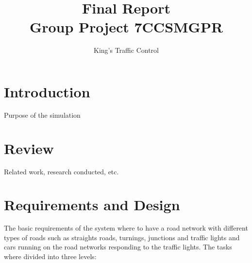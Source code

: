 \documentclass{article}
\begin{document}
	\title{Final Report\\ Group Project 7CCSMGPR} 	
    	\author{King's Traffic Control}
	\maketitle
	
	\section{Introduction}
		Purpose of the simulation
	\section{Review}
		Related work, research conducted, etc.
	\section{Requirements and Design}
			The basic requirements of the system where to have a road network with different types of roads such as straights roads, turnings, junctions and traffic lights and cars running on the road networks responding to the traffic lights.
			 The tasks where divided into three levels:
\end{document}

